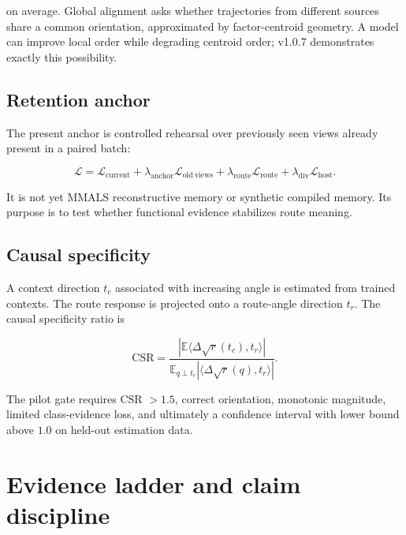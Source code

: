 \documentclass[11pt,a4paper]{article}
\newcommand{\E}{\mathbb{E}}
\newcommand{\loss}{\mathcal{L}}
\begin{document}
on average. Global alignment asks whether trajectories from different sources share a common orientation, approximated by factor-centroid geometry. A model can improve local order while degrading centroid order; v1.0.7 demonstrates exactly this possibility.

\subsection{Retention anchor}

The present anchor is controlled rehearsal over previously seen views already present in a paired batch:

\begin{equation}
 \loss = \loss_{\mathrm{current}}
 + \lambda_{\mathrm{anchor}}\loss_{\mathrm{old\ views}}
 + \lambda_{\mathrm{route}}\loss_{\mathrm{route}}
 + \lambda_{\mathrm{div}}\loss_{\mathrm{host}}.
\end{equation}

It is not yet MMALS reconstructive memory or synthetic compiled memory. Its purpose is to test whether functional evidence stabilizes route meaning.

\subsection{Causal specificity}

A context direction $t_c$ associated with increasing angle is estimated from trained contexts. The route response is projected onto a route-angle direction $t_r$. The causal specificity ratio is

\begin{equation}
 \mathrm{CSR}
 =\frac{|\E\langle \Delta\sqrt r(t_c),t_r\rangle|}
 {\E_{q\perp t_c}|\langle\Delta\sqrt r(q),t_r\rangle|}.
\end{equation}

The pilot gate requires CSR $>1.5$, correct orientation, monotonic magnitude, limited class-evidence loss, and ultimately a confidence interval with lower bound above $1.0$ on held-out estimation data.

\section{Evidence ladder and claim discipline}
\end{document}
